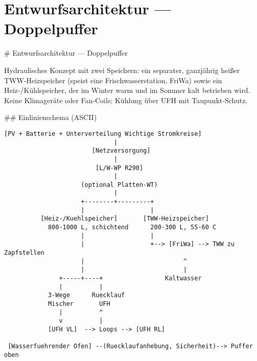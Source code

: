 \documentclass[11pt,oneside]{report}
\begin{document}
\chapter{Entwurfsarchitektur — Doppelpuffer}
\begin{markdown}
# Entwurfsarchitektur — Doppelpuffer

Hydraulisches Konzept mit zwei Speichern: ein separater, ganzjährig heißer TWW‑Heizspeicher (speist eine Frischwasserstation, FriWa) sowie ein Heiz‑/Kühlspeicher, der im Winter warm und im Sommer kalt betrieben wird. Keine Klimageräte oder Fan‑Coils; Kühlung über UFH mit Taupunkt‑Schutz.

## Einlinienschema (ASCII)

\end{markdown}
\begin{Verbatim}[fontsize=\small]
           [PV + Batterie + Unterverteilung Wichtige Stromkreise]
                              |
                        [Netzversorgung]
                              |
                         [L/W-WP R290]
                              |
                     (optional Platten-WT)
                              |
                     +--------+---------+
                     |                  |
          [Heiz-/Kuehlspeicher]       [TWW-Heizspeicher]
            800-1000 L, schichtend      200-300 L, 55-60 C
                     |                  |
                     |                  +--> [FriWa] --> TWW zu Zapfstellen
                     |                           ^
                     |                           |
               +-----+----+                 Kaltwasser
               |          |
            3-Wege      Ruecklauf
            Mischer       UFH
               |          ^
               v          |
            [UFH VL]  --> Loops --> [UFH RL]

 [Wasserfuehrender Ofen] --(Ruecklaufanhebung, Sicherheit)--> Puffer oben
\end{Verbatim}
\end{document}
